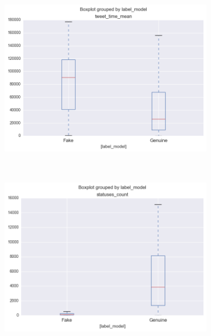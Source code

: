 \documentclass[a4paper, 12pt]{report}
\begin{document}
\begin{figure}[H]
\begin{subfigure}[c]{0.3\linewidth}
	\end{subfigure}
	~
	\begin{subfigure}[c]{0.3\linewidth}
	\includegraphics[width =\linewidth]{tweet_time_mean.png}
	\end{subfigure}
	~
	\begin{subfigure}[c]{0.3\linewidth}
		\includegraphics[width =\linewidth]{statuses_count.png}
	\end{subfigure}
	~
	\begin{subfigure}[c]{0.3\linewidth}

\end{subfigure}
\end{figure}
\end{document}
